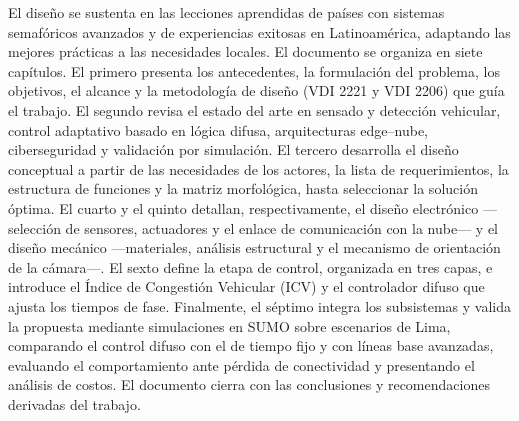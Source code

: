 El diseño se sustenta en las lecciones aprendidas de países con sistemas semafóricos avanzados y de
experiencias exitosas en Latinoamérica, adaptando las mejores prácticas a las necesidades locales. El
documento se organiza en siete capítulos. El primero presenta los antecedentes, la formulación del
problema, los objetivos, el alcance y la metodología de diseño (VDI 2221 y VDI 2206) que guía el trabajo.
El segundo revisa el estado del arte en sensado y detección vehicular, control adaptativo basado en lógica
difusa, arquitecturas edge--nube, ciberseguridad y validación por simulación. El tercero desarrolla el
diseño conceptual a partir de las necesidades de los actores, la lista de requerimientos, la estructura de
funciones y la matriz morfológica, hasta seleccionar la solución óptima. El cuarto y el quinto detallan,
respectivamente, el diseño electrónico ---selección de sensores, actuadores y el enlace de comunicación con
la nube--- y el diseño mecánico ---materiales, análisis estructural y el mecanismo de orientación de la
cámara---. El sexto define la etapa de control, organizada en tres capas, e introduce el Índice de
Congestión Vehicular (ICV) y el controlador difuso que ajusta los tiempos de fase. Finalmente, el séptimo
integra los subsistemas y valida la propuesta mediante simulaciones en SUMO sobre escenarios de Lima,
comparando el control difuso con el de tiempo fijo y con líneas base avanzadas, evaluando el
comportamiento ante pérdida de conectividad y presentando el análisis de costos. El documento cierra con
las conclusiones y recomendaciones derivadas del trabajo.

